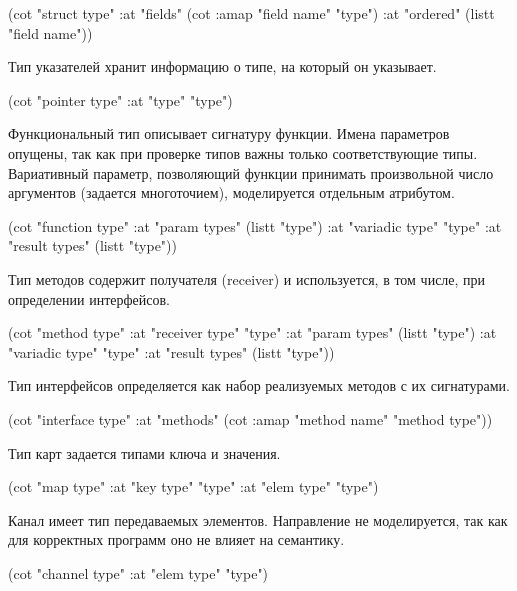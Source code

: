 \documentclass[12pt,twoside,russian]{article}
\begin{document}
\begin{ABMLCode}
(cot "struct type" :at "fields"  (cot :amap "field name" "type")
                   :at "ordered" (listt "field name"))
\end{ABMLCode}

Тип указателей хранит информацию о типе, на который он указывает. 

\begin{ABMLCode}
(cot "pointer type" :at "type" "type")
\end{ABMLCode}

Функциональный тип описывает сигнатуру функции. Имена параметров опущены, так как при проверке типов важны только соответствующие типы. Вариативный параметр, позволяющий функции принимать произвольной число аргументов (задается многоточием), моделируется отдельным атрибутом.

\begin{ABMLCode}
(cot "function type" 
	:at "param types"   (listt "type") 
	:at "variadic type" "type" 
	:at "result types"  (listt "type"))
\end{ABMLCode}

Тип методов содержит получателя (receiver) и используется, в том числе, при определении интерфейсов.

\begin{ABMLCode}
(cot "method type" 
	:at "receiver type" "type" 
	:at "param types"   (listt "type") 
	:at "variadic type" "type" 
	:at "result types"  (listt "type"))
\end{ABMLCode}

Тип интерфейсов определяется как набор реализуемых методов с их сигнатурами. 

\begin{ABMLCode}
(cot "interface type" 
    :at "methods" (cot :amap "method name" "method type"))
\end{ABMLCode}

Тип карт задается типами ключа и значения. 

\begin{ABMLCode}
(cot "map type" :at "key type" "type" :at "elem type" "type")
\end{ABMLCode}

Канал имеет тип передаваемых элементов. Направление не моделируется, так как для корректных программ оно не влияет на семантику.

\begin{ABMLCode}
(cot "channel type" :at "elem type" "type")
\end{ABMLCode}
\end{document}
